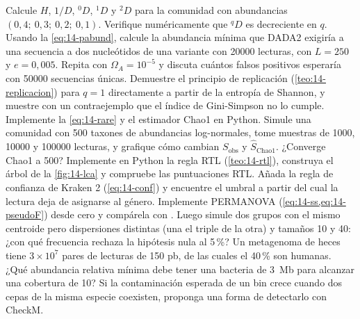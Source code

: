 \begin{ejercicios}
 Calcule $H$, $1/D$, ${}^0D$, ${}^1D$ y ${}^2D$ para la comunidad con abundancias $(0{,}4;\ 0{,}3;\ 0{,}2;\ 0{,}1)$. Verifique numéricamente que ${}^qD$ es decreciente en $q$.
 Usando la \cref{eq:14-pabund}, calcule la abundancia mínima que DADA2 exigiría a una secuencia a dos nucleótidos de una variante con \num{20000} lecturas, con $L=250$ y $e=0{,}005$. Repita con $\Omega_A = 10^{-5}$ y discuta cuántos falsos positivos esperaría con \num{50000} secuencias únicas.
 Demuestre el principio de replicación (\cref{teo:14-replicacion}) para $q=1$ directamente a partir de la entropía de Shannon, y muestre con un contraejemplo que el índice de Gini-Simpson no lo cumple.
 Implemente la \cref{eq:14-rare} y el estimador Chao1 en Python. Simule una comunidad con 500 taxones de abundancias log-normales, tome muestras de \num{1000}, \num{10000} y \num{100000} lecturas, y grafique cómo cambian $S_{\text{obs}}$ y $\hat{S}_{\text{Chao1}}$. ¿Converge Chao1 a 500?
 Implemente en Python la regla RTL (\cref{teo:14-rtl}), construya el árbol de la \cref{fig:14-lca} y compruebe las puntuaciones RTL. Añada la regla de confianza de Kraken 2 (\cref{eq:14-conf}) y encuentre el umbral a partir del cual la lectura deja de asignarse al género.
 Implemente PERMANOVA (\cref{eq:14-ss,eq:14-pseudoF}) desde cero y compárela con . Luego simule dos grupos con el mismo centroide pero dispersiones distintas (una el triple de la otra) y tamaños 10 y 40: ¿con qué frecuencia rechaza la hipótesis nula al 5\,\%?
 Un metagenoma de heces tiene $3\times10^7$ pares de lecturas de 150 pb, de las cuales el 40\,\% son humanas. ¿Qué abundancia relativa mínima debe tener una bacteria de \SI{3}{Mb} para alcanzar una cobertura de 10? Si la contaminación esperada de un bin crece cuando dos cepas de la misma especie coexisten, proponga una forma de detectarlo con CheckM.
\end{ejercicios}

